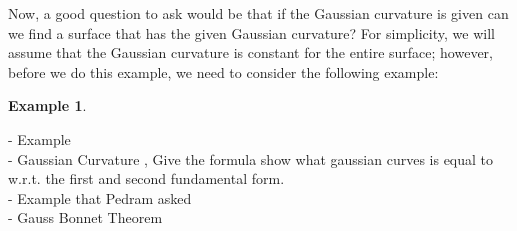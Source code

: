 \documentclass{article}
\theoremstyle{plain}
\theoremstyle{definition}
\newtheorem{example}{Example}
\theoremstyle{remark}
\begin{document}
Now, a good question to ask would be that if the Gaussian curvature is given can we find a surface that has the given Gaussian curvature? For simplicity, we will assume that the Gaussian curvature is constant for the entire surface; however, before we do this example, we need to consider the following example:

\begin{example}
    
\end{example}


    {\color{red}
        - Example \checkmark \\
        - Gaussian Curvature , Give the formula show what gaussian curves is equal to w.r.t. the first and second fundamental form. \checkmark\\
        - Example that Pedram asked \\
        - Gauss Bonnet Theorem }
        
\end{document}
